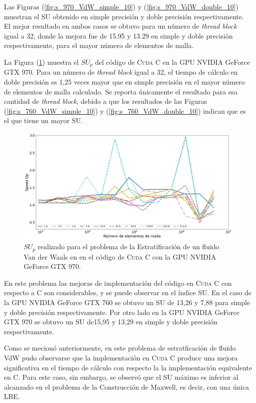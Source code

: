 \newpage

Las Figuras (\ref{fig:s_970_VdW_simple_10}) y (\ref{fig:s_970_VdW_double_10}) muestran el SU obtenido en simple precisión y doble precisión respectivamente. El mejor resultado en ambos casos se obtuvo para un número de \textit{thread block} igual a 32, donde la mejora fue de 15.95 y 13.29 en simple y doble precisión respectivamente, para el mayor número de elementos de malla.

La Figura (\ref{fig:c_970_VdW_cuda_10}) muestra el ${SU}_p$ del código de \textsc{Cuda C} en la GPU NVIDIA GeForce GTX 970. Para un número de \textit{thread block} igual a 32, el tiempo de cálculo en doble precisión es 1,25 veces mayor que en simple precisión en el mayor número de elementos de malla calculado. Se reporta únicamente el resultado para esa cantidad de \textit{thread block}, debido a que los resultados de las Figuras (\ref{fig:s_760_VdW_simple_10}) y (\ref{fig:s_760_VdW_double_10}) indican que es el que tiene un mayor SU.


\begin{figure}[h!]
	\centering
	\includegraphics[width=\textwidth]{figs/cap4/c_970_VdW_cuda_10}
	\caption{$SU_p$ realizado para el problema de la Estratificación de un fluido Van der Waals en en el código de \textsc{Cuda C} con la GPU NVIDIA GeForce GTX 970.} 
	\label{fig:c_970_VdW_cuda_10}	
\end{figure}


En este problema las mejoras de implementación del código en \textsc{Cuda C} con respecto a \textsc{C} son considerables, y se puede observar en el índice SU. En el caso de la GPU NVIDIA GeForce GTX 760 se obtuvo un SU de 13,26 y 7,88 para simple y doble precisión respectivamente. Por otro lado en la GPU NVIDIA GeForce GTX 970 se obtuvo un SU de15,95 y 13,29 en simple y doble precisión respectivamente.

Como se mecionó anteriormente, en este problema de estratficación de fluido VdW pudo observarse que la implementación en \textsc{Cuda C} produce una mejora significativa en el tiempo de cálculo con respecto la la implementación equivalente en \textsc{C}. Para este caso, sin embargo, se observó que el SU máximo es inferior al alcanzado en el problema de la Construcción de Maxwell, es decir, con una única LBE.


